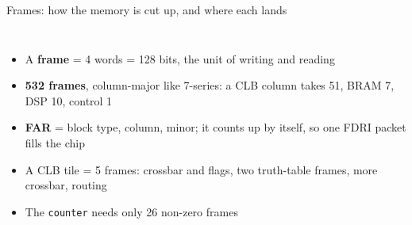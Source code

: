 \documentclass[aspectratio=169,11pt]{beamer}
\begin{document}
\begin{frame}{Frames: how the memory is cut up, and where each lands}
  \begin{columns}[c]
    \centering
    \small
    \begin{itemize}
      \item A \textbf{frame} = 4 words = 128 bits, the unit of writing and reading
      \item \textbf{532 frames}, column-major like 7-series: a CLB column takes 51, BRAM 7, DSP 10, control 1
      \item \textbf{FAR} = block type, column, minor; it counts up by itself, so one FDRI packet fills the chip
      \item A CLB tile = 5 frames: crossbar and flags, two truth-table frames, more crossbar, routing
      \item The \texttt{counter} needs only 26 non-zero frames
    \end{itemize}
  \end{columns}
\end{frame}
\end{document}
